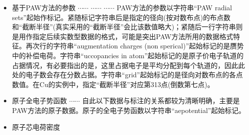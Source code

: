 \begin{itemize}
{{}}
熟悉赝势理论的读者都知道，投影子函数$\tilde p_l$与原子波函数相关，其构造依赖角动量$l$和赝波函数的能量。与势函数的$\vec G$空间布点数(1000)不同，投影子函数在$\vec k$空间和实空间的布点数都为100。因在倒空间的截断值列于第一行，并跟随字符``\textrm{T}''标注。其下字符串``Non local Part''标记非局域部分的投影子函数相关的贡献，紧随标记行的三个参数分别为投影子函数的轨道角动量$l$、轨道数目和实空间径向截断半径。再下一行则是原子超软赝势或\textrm{PAW}方法所涉及的非局域部分贡献的$D^{\mathrm{ion}}$项(共四个)，这几个数据的获得，恰恰是\textrm{USPP}或\textrm{PAW}方法的有价值部分。随后即为分别用字符串``Reciprocal Space Part''和``Real Space Part''标记的轨道角动量$l$的投影子函数在倒空间和正空间的数值。具体到\textrm{Cu}元素，依次为$l=2, 0, 1$的各两组投影子函数。
\item 基于\textrm{PAW}方法的参数
{\fontsize{8.2pt}{6.2pt}\selectfont{
}}
$\cdots\cdots$
{\fontsize{8.2pt}{6.2pt}\selectfont{
}}
$\cdots\cdots$
{\fontsize{8.2pt}{6.2pt}\selectfont{
}}
$\cdots\cdots$
{\fontsize{7.2pt}{5.2pt}\selectfont{
}}
\textrm{PAW}方法的参数以字符串``\textrm{PAW radial sets}''起始作标记。紧随标记字符串后是指定的径向(按对数布点)的布点数和``截断半径''(真实采用的``截断半径''会比该数值略大)；紧随后一行字符串则是用作指定后续实数型数据的格式，可能是突出\textrm{PAW}方法所用的数据格式特征。再次行的字符串``\textrm{augmentation charges (non sperical)}''起始标记的是赝势中的补偿电荷。字符串``\textrm{uccopancies in atom}''起始标记的是原子价电子轨道的占据情况，有必要指出的是，这里占据电子是平均分配到每个轨道的，因此此处的电子数会存在分数占据。字符串``\textrm{grid}''起始标记的是径向对数布点的各点数值。在\textrm{Cu}的实例中，指定``截断半径''对应第313点(倒数第七点)。
\item 原子全电子势函数
{\fontsize{7.2pt}{5.2pt}\selectfont{
}}
$\cdots\cdots$
{\fontsize{7.2pt}{5.2pt}\selectfont{
}}
自此以下数据与标注的关系都较为清晰明确，主要是\textrm{PAW}方法的原子数据。原子的全电子势函数以字符串``aepotential''起始标记。
\item 原子芯电荷密度
{\fontsize{7.2pt}{5.2pt}\selectfont{
}}
\end{itemize}
